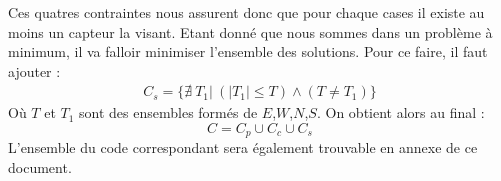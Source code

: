 \documentclass[a4paper]{article}
\begin{document}
Ces quatres contraintes nous assurent donc que pour chaque cases il existe au moins un capteur la visant. Etant donné que nous sommes dans un problème à minimum, il va falloir minimiser l'ensemble des solutions. Pour ce faire, il faut ajouter : 
\begin{align*}
C_s = \{ \nexists \ T_1 | \ (| T_1 | \leq T) \wedge (T \neq T_1) \}
\end{align*}
Où $T$ et $T_1$ sont des ensembles formés de $E$,$W$,$N$,$S$. On obtient alors au final : 
\begin{equation*}
C = C_p \cup C_c \cup C_s
\end{equation*}
L'ensemble du code correspondant sera également trouvable en annexe de ce document.
\end{document}
